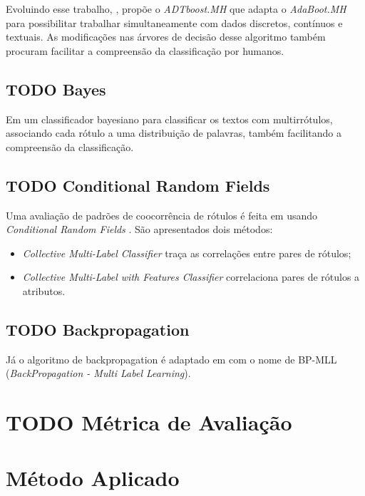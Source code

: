 \documentclass[runningheads,a4paper]{llncs}
\begin{document}
Evoluindo esse trabalho, \cite{De_Comite2003-lg}, propõe o \textit{ADTboost.MH} que adapta o \textit{AdaBoot.MH} para possibilitar trabalhar simultaneamente com dados discretos, contínuos e textuais. As modificações nas árvores de decisão desse algoritmo também procuram facilitar a compreensão da classificação por humanos.

\subsection{TODO Bayes}

Em \cite{McCallum1999-iz} um classificador bayesiano para classificar os textos com multirrótulos, associando cada rótulo a uma distribuição de palavras, também facilitando a compreensão da classificação.

\subsection{TODO Conditional Random Fields}
Uma avaliação de padrões de coocorrência de rótulos é feita em \cite{Ghamrawi2005-fw} usando \textit{Conditional Random Fields} \cite{Lafferty2001-ov}. São apresentados dois métodos: 

\begin{itemize}
	\item \textit{Collective Multi-Label Classifier} traça as correlações entre pares de rótulos;
	\item \textit{Collective Multi-Label with Features Classifier} correlaciona pares de rótulos a atributos.	
\end{itemize}

\subsection{TODO Backpropagation}

Já o algoritmo de backpropagation é adaptado em \cite{Zhang2006-vf} com o nome de BP-MLL (\textit{BackPropagation - Multi Label Learning}).


\section{TODO Métrica de Avaliação}

\section{Método Aplicado} \label{sec:justificativa}
\end{document}
